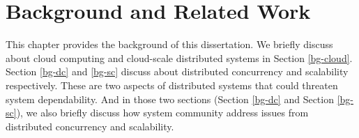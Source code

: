 \chapter{Background and Related Work}
\label{chp-bg}

This chapter provides the background of this dissertation. We briefly discuss
about cloud computing and cloud-scale distributed systems in Section
\ref{bg-cloud}. Section \ref{bg-dc} and \ref{bg-sc} discuss about distributed
concurrency and scalability respectively. These are two aspects of distributed
systems that could threaten system dependability. And in those two sections
(Section \ref{bg-dc} and Section \ref{bg-sc}), we also briefly discuss how
system community address issues from distributed concurrency and scalability.
%



%


